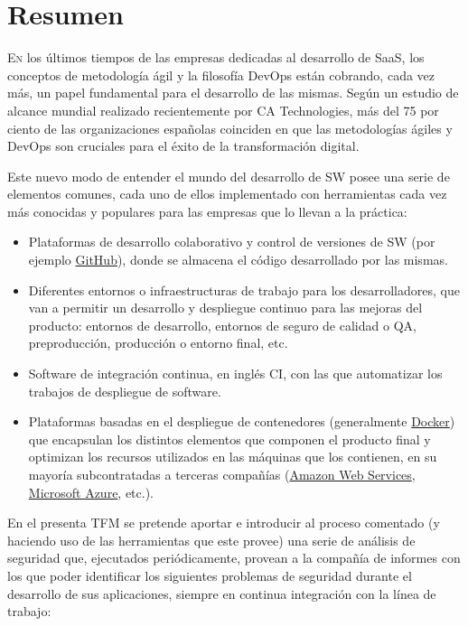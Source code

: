 \chapter*{Resumen}
\pagestyle{especial}
{}

\lettrine[lraise=-0.1, lines=2, loversize=0.2]{E}{n} los últimos tiempos de las empresas dedicadas al desarrollo de \gls{SaaS}, los conceptos de metodología ágil y la filosofía \gls{DevOps} están cobrando, cada vez más, un papel fundamental para el desarrollo de las mismas\cite{consultorit2017}. Según un estudio de alcance mundial realizado recientemente por CA Technologies, más del 75 por ciento de las organizaciones españolas coinciden en que las metodologías ágiles y \gls{DevOps} son cruciales para el éxito de la transformación digital\cite{catechnologies2017}. 

Este nuevo modo de entender el mundo del desarrollo de \gls{SW} posee una serie de elementos comunes, cada uno de ellos implementado con herramientas cada vez más conocidas y populares para las empresas que lo llevan a la práctica: 

\begin{itemize}
	\item Plataformas de desarrollo colaborativo y control de versiones de \gls{SW} (por ejemplo \href{https://github.com/}{GitHub}), donde se almacena el código desarrollado por las mismas.
	\item Diferentes entornos o infraestructuras de trabajo para los desarrolladores, que van a permitir un desarrollo y despliegue continuo para las mejoras del producto: entornos de desarrollo, entornos de seguro de calidad o \gls{QA}, preproducción, producción o entorno final, etc.
	\item Software de integración continua, en inglés \gls{CI}, con las que automatizar los trabajos de despliegue de software.
	\item Plataformas basadas en el despliegue de contenedores (generalmente \href{https://www.docker.com/}{Docker}) que encapsulan los distintos elementos que componen el producto final y optimizan los recursos utilizados en las máquinas que los contienen, en su mayoría subcontratadas a terceras compañías (\href{https://aws.amazon.com/es/}{Amazon Web Services}, \href{https://azure.microsoft.com/es-es/}{Microsoft Azure}, etc.).
\end{itemize}

En el presenta \gls{TFM} se pretende aportar e introducir al proceso comentado (y haciendo uso de las herramientas que este provee) una serie de análisis de seguridad que, ejecutados periódicamente, provean a la compañía de informes con los que poder identificar los siguientes problemas de seguridad durante el desarrollo de sus aplicaciones, siempre en continua integración con la línea de trabajo:


